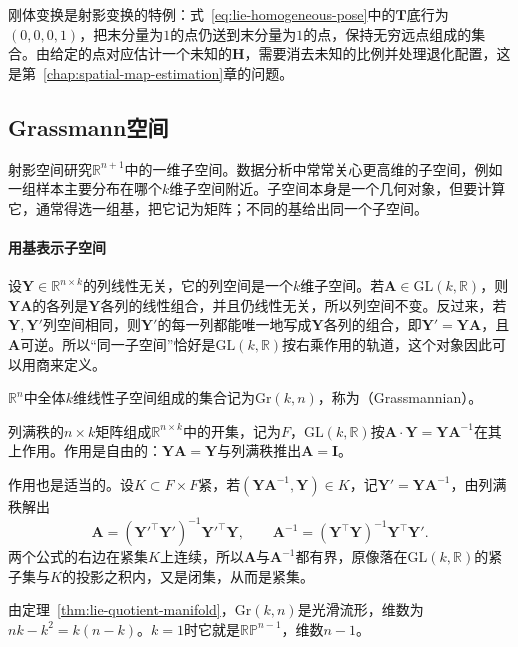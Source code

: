 刚体变换是射影变换的特例：式~\eqref{eq:lie-homogeneous-pose}中的$\bm T$底行为$(0,0,0,1)$，把末分量为$1$的点仍送到末分量为$1$的点，保持无穷远点组成的集合。由给定的点对应估计一个未知的$\bm H$，需要消去未知的比例并处理退化配置，这是第~\ref{chap:spatial-map-estimation}章的问题。

\subsection{Grassmann空间}
\label{sec:lie-grassmann}

射影空间研究$\mathbb R^{n+1}$中的一维子空间。数据分析中常常关心更高维的子空间，例如一组样本主要分布在哪个$k$维子空间附近。子空间本身是一个几何对象，但要计算它，通常得选一组基，把它记为矩阵；不同的基给出同一个子空间。

\paragraph{用基表示子空间}
设$\bm Y\in\mathbb R^{n\times k}$的列线性无关，它的列空间是一个$k$维子空间。若$\bm A\in\mathrm{GL}(k,\mathbb R)$，则$\bm Y\bm A$的各列是$\bm Y$各列的线性组合，并且仍线性无关，所以列空间不变。反过来，若$\bm Y,\bm Y'$列空间相同，则$\bm Y'$的每一列都能唯一地写成$\bm Y$各列的组合，即$\bm Y'=\bm Y\bm A$，且$\bm A$可逆。所以“同一子空间”恰好是$\mathrm{GL}(k,\mathbb R)$按右乘作用的轨道，这个对象因此可以用商来定义。

\begin{definition}[Grassmann空间]
\label{def:lie-grassmann}
$\mathbb R^n$中全体$k$维线性子空间组成的集合记为$\mathrm{Gr}(k,n)$，称为（Grassmannian）。
\end{definition}

列满秩的$n\times k$矩阵组成$\mathbb R^{n\times k}$中的开集，记为$F$，$\mathrm{GL}(k,\mathbb R)$按$\bm A\cdot\bm Y=\bm Y\bm A^{-1}$在其上作用。作用是自由的：$\bm Y\bm A=\bm Y$与列满秩推出$\bm A=\bm I$。

作用也是适当的。设$K\subset F\times F$紧，若$(\bm Y\bm A^{-1},\bm Y)\in K$，记$\bm Y'=\bm Y\bm A^{-1}$，由列满秩解出
\[
\bm A=(\bm Y'^\top\bm Y')^{-1}\bm Y'^\top\bm Y,\qquad
\bm A^{-1}=(\bm Y^\top\bm Y)^{-1}\bm Y^\top\bm Y'.
\]
两个公式的右边在紧集$K$上连续，所以$\bm A$与$\bm A^{-1}$都有界，原像落在$\mathrm{GL}(k,\mathbb R)$的紧子集与$K$的投影之积内，又是闭集，从而是紧集。

由定理~\ref{thm:lie-quotient-manifold}，$\mathrm{Gr}(k,n)$是光滑流形，维数为$nk-k^2=k(n-k)$。$k=1$时它就是$\mathbb{RP}^{n-1}$，维数$n-1$。

